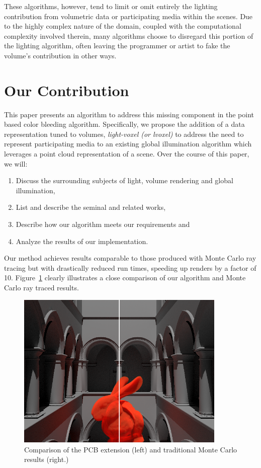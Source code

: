 \documentclass[12pt]{ucthesis}
\begin{document}
These algorithms, however, tend to limit or omit entirely the lighting contribution from volumetric data or participating media within the scenes.  Due to the highly complex nature of the domain, coupled with the computational complexity involved therein, many algorithms choose to disregard this portion of the lighting algorithm, often leaving the programmer or artist to fake the volume's contribution in other ways.


\section{Our Contribution}

This paper presents an algorithm to address this missing component in the point based color bleeding algorithm.  Specifically, we propose the addition of a data representation tuned to volumes,  \emph{light-voxel (or lvoxel)} to address the need to represent participating media to an existing global illumination algorithm which leverages a point cloud representation of a scene.  Over the course of this paper, we will:

\begin{enumerate}
\item Discuss the surrounding subjects of light, volume rendering and global illumination,
\item List and describe the seminal and related works,
\item Describe how our algorithm meets our requirements and
\item Analyze the results of our implementation.
\end{enumerate}

Our method achieves results comparable to those produced with Monte Carlo ray tracing but with drastically reduced run times, speeding up renders by a factor of 10.  Figure~\ref{fig:compare} clearly illustrates a close comparison of our algorithm and Monte Carlo ray traced results.

\begin{figure}[h!]
    \centering
    \includegraphics[width=100mm]{img/compare.png}
    \caption{Comparison of the PCB extension (left) and traditional Monte Carlo results (right.)}
    \label{fig:compare}
\end{figure}
\end{document}

